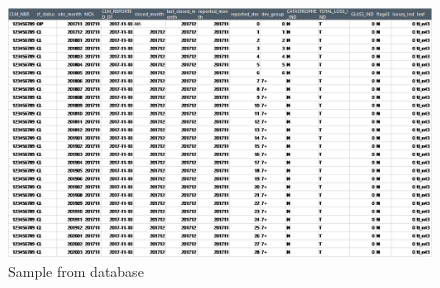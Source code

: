 	\begin{figure}[H]
		\begin{center}
			\includegraphics[scale=0.4]{Graphiques/sample_1} 
			\renewcommand{\figurename}{Figure}
			\caption{Sample from database}\label{Fig_sample_1}
		\end{center}
	\end{figure}
	
